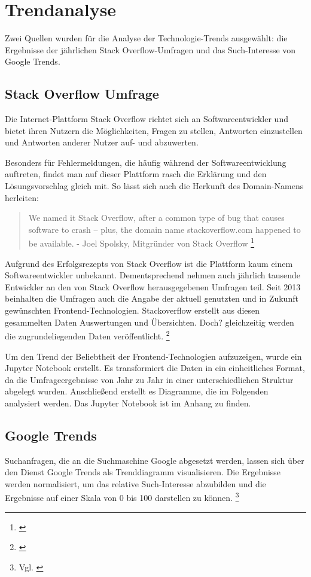 \section{Trendanalyse}
\label{sec:Trendanalyse}


Zwei Quellen wurden für die Analyse der Technologie-Trends ausgewählt: die Ergebnisse der jährlichen Stack Overflow-Umfragen und das Such-Interesse von Google Trends.

\subsection{Stack Overflow Umfrage}
Die Internet-Plattform Stack Overflow richtet sich an Softwareentwickler und bietet ihren Nutzern die Möglichkeiten, Fragen zu stellen, Antworten einzustellen und Antworten anderer Nutzer auf- und abzuwerten.

Besonders für Fehlermeldungen, die häufig während der Softwareentwicklung auftreten, findet man auf dieser Plattform rasch die Erklärung und den Lösungsvorschlag gleich mit.
So lässt sich auch die Herkunft des Domain-Namens herleiten:

\begin{quotation}
We named it Stack Overflow, after a common type of bug that causes software to crash -- plus, the domain name stackoverflow.com happened to be available. - Joel Spolsky, Mitgründer von Stack Overflow \footnote{\cite{TheUnprovenPath}}
\end{quotation}

Aufgrund des Erfolgsrezepts von Stack Overflow ist die Plattform kaum einem Softwareentwickler unbekannt.
Dementsprechend nehmen auch jährlich tausende Entwickler an den von Stack Overflow herausgegebenen Umfragen teil.
Seit  2013 beinhalten die Umfragen auch die Angabe der aktuell genutzten und in Zukunft gewünschten Frontend-Technologien.
Stackoverflow erstellt aus diesen gesammelten Daten Auswertungen und Übersichten.
Doch? gleichzeitig werden die zugrundeliegenden Daten veröffentlicht.
\footnote{\cite{StackOverflowInsights}} 

Um den Trend der Beliebtheit der Frontend-Technologien aufzuzeigen, wurde ein Jupyter Notebook erstellt.
Es transformiert die Daten in ein einheitliches Format, da die  Umfrageergebnisse von Jahr zu Jahr in einer unterschiedlichen Struktur abgelegt wurden.
Anschließend erstellt es Diagramme, die im Folgenden analysiert werden.
Das Jupyter Notebook ist im  Anhang zu finden.

\subsection{Google Trends} Suchanfragen, die an die Suchmaschine Google  abgesetzt werden, lassen sich  über den Dienst Google Trends  als Trenddiagramm visualisieren.
Die Ergebnisse werden normalisiert, um das relative Such-Interesse abzubilden und die Ergebnisse auf einer Skala von 0 bis 100 darstellen zu können.
\footnote{Vgl. \cite{GoogleTrendsHilfe}}


